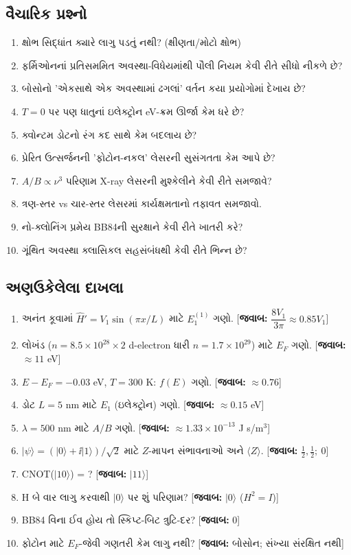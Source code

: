 \subsection{વૈચારિક પ્રશ્નો}
\begin{enumerate}[label=\textbf{Q\arabic*.}]
  \item ક્ષોભ સિદ્ધાંત ક્યારે લાગુ પડતું નથી? (ક્ષીણતા/મોટો ક્ષોભ)
  \item ફર્મિઓનનાં પ્રતિસમમિત અવસ્થા-વિધેયમાંથી પૌલી નિયમ કેવી રીતે સીધો નીકળે છે?
  \item બોસોનો 'એકસાથે એક અવસ્થામાં ઢગલાં' વર્તન કયા પ્રયોગોમાં દેખાય છે?
  \item $T=0$ પર પણ ધાતુનાં ઇલેક્ટ્રોન eV-ક્રમ ઊર્જા કેમ ધરે છે?
  \item ક્વોન્ટમ ડોટનો રંગ કદ સાથે કેમ બદલાય છે?
  \item પ્રેરિત ઉત્સર્જનની 'ફોટોન-નકલ' લેસરની સુસંગતતા કેમ આપે છે?
  \item $A/B\propto\nu^{3}$ પરિણામ X-ray લેસરની મુશ્કેલીને કેવી રીતે સમજાવે?
  \item ત્રણ-સ્તર vs ચાર-સ્તર લેસરમાં કાર્યક્ષમતાનો તફાવત સમજાવો.
  \item નો-ક્લોનિંગ પ્રમેય BB84ની સુરક્ષાને કેવી રીતે ખાતરી કરે?
  \item ગૂંથિત અવસ્થા ક્લાસિકલ સહસંબંધથી કેવી રીતે ભિન્ન છે?
\end{enumerate}

\subsection{અણઉકેલેલા દાખલા}
\begin{enumerate}[label=\textbf{P\arabic*.}]
  \item અનંત કૂવામાં $\hat H'=V_1\sin(\pi x/L)$ માટે $E_1^{(1)}$ ગણો. \hfill [\textbf{જવાબ:} $\dfrac{8V_1}{3\pi}\approx0.85V_1$]
  \item લોખંડ ($n=8.5\times10^{28}\times2$ d-electron ધારી $n=1.7\times10^{29}$) માટે $E_F$ ગણો. \hfill [\textbf{જવાબ:} $\approx11$ eV]
  \item $E-E_F=-0.03$ eV, $T=300$ K: $f(E)$ ગણો. \hfill [\textbf{જવાબ:} $\approx0.76$]
  \item ડોટ $L=5$ nm માટે $E_1$ (ઇલેક્ટ્રોન) ગણો. \hfill [\textbf{જવાબ:} $\approx0.15$ eV]
  \item $\lambda=500$ nm માટે $A/B$ ગણો. \hfill [\textbf{જવાબ:} $\approx1.33\times10^{-13}$ J s/m$^3$]
  \item $|\psi\rangle=(|0\rangle+\ii|1\rangle)/\sqrt2$ માટે $Z$-માપન સંભાવનાઓ અને $\langle Z\rangle$. \hfill [\textbf{જવાબ:} $\tfrac12,\tfrac12;\ 0$]
  \item CNOT($|10\rangle$) = ? \hfill [\textbf{જવાબ:} $|11\rangle$]
  \item H બે વાર લાગુ કરવાથી $|0\rangle$ પર શું પરિણામ? \hfill [\textbf{જવાબ:} $|0\rangle$ ($H^2=I$)]
  \item BB84 વિના ઈવ હોય તો સ્કિપ્ટ-બિટ ત્રુટિ-દર? \hfill [\textbf{જવાબ:} $0$]
  \item ફોટોન માટે $E_F$-જેવી ગણતરી કેમ લાગુ નથી? \hfill [\textbf{જવાબ:} બોસોન; સંખ્યા સંરક્ષિત નથી]
\end{enumerate}

